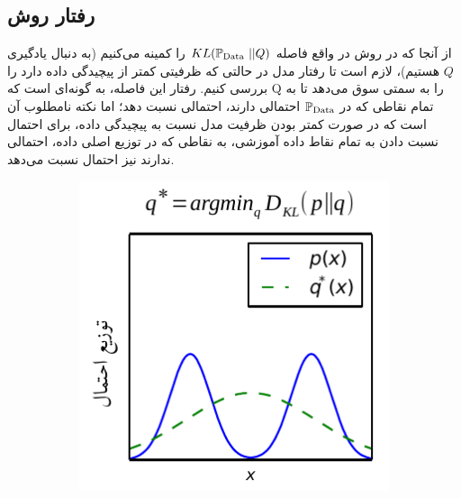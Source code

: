  \subsection{ رفتار
روش \maxlikelihood{}}
از آنجا که در روش \maxlikelihood{} در واقع فاصله $KL(\mathbb P_\text{Data} ~ || Q)$ را کمینه می‌کنیم (به دنبال یادگیری $Q$ هستیم)، لازم است تا رفتار مدل در حالتی که ظرفیتی کمتر از پیچیدگی داده دارد را بررسی کنیم. رفتار این فاصله، به گونه‌ای است که Q را به سمتی سوق می‌دهد تا به تمام نقاطی که در $\mathbb P_\text{Data}$ احتمالی دارند، احتمالی نسبت دهد؛ اما نکته نامطلوب آن است که در صورت کمتر بودن ظرفیت مدل نسبت به پیچیدگی داده، برای احتمال نسبت دادن به تمام نقاط داده آموزشی، به نقاطی که در توزیع اصلی داده، احتمالی ندارند نیز احتمال نسبت می‌دهد. 
\begin{figure}[h]
    \centering
    \begin{subfigure}[t!]{.4\textwidth}
        \centering
        \includegraphics[height=1.\textwidth]{images/KLvsReverseKL_KL.pdf}
        \caption{}
        \label{fig:meanseeking_KL}
    \end{subfigure}
    \begin{subfigure}[t!]{.4\textwidth}
        \centering

\end{subfigure}
\end{figure}

